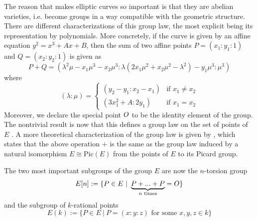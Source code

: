 The reason that makes elliptic curves so important is that they are abelian varieties, i.e. become groups in a way compatible with the geometric structure.
There are different characterizations of this group law, the most explicit being its representation by polynomials.
More concretely, if the curve is given by an affine equation $y^2 = x^3 + Ax + B$, then the sum of two affine points $P = (x_1 : y_1 : 1)$ and $Q = (x_2 : y_2 : 1)$ is given as
\begin{equation*}
    P + Q = ( \lambda^2\mu - x_1\mu^3 - x_2\mu^3 : \lambda(2x_1\mu^2 + x_2\mu^2 - \lambda^2) - y_1\mu^3 : \mu^3 )
\end{equation*}
where
\begin{equation*}
    (\lambda : \mu) = \begin{cases}
        (y_2 - y_1 : x_2 - x_1) & \text{if $x_1 \neq x_2$} \\
        (3x_1^2 + A : 2y_1) & \text{if $x_1 = x_2$}
    \end{cases}
\end{equation*}
Moreover, we declare the special point $O$ to be the identity element of the group.
The nontrivial result is now that this defines a group law on the set of points of $E$ \cite[Prop.~III.2.2]{arithmetic_elliptic_curves}. 
A more theoretical characterization of the group law is given by \cite[Prop.~III.3.4]{arithmetic_elliptic_curves}, which states that the above operation $+$ is the same as the group law induced by a natural isomorphism $E \cong \mathrm{Pic}(E)$ from the points of $E$ to its Picard group. 

The two most important subgroups of the group $E$ are now the $n$-torsion group
\begin{equation*}
    E[n] := \{ P \in E \ | \ \underbrace{P + ... + P}_{\text{$n$ times}} = \IdPoint \}
\end{equation*}
and the subgroup of $k$-rational points
\begin{equation*}
    E(k) := \{ P \in E \ | \ \text{$P = (x : y : z)$ for some $x, y, z \in k$} \}
\end{equation*}

